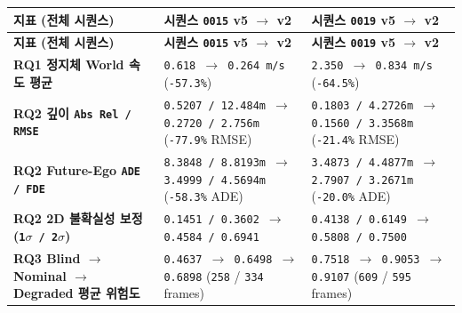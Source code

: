 \documentclass[10.5pt,a4paper]{article}
\begin{document}
\begin{footnotesize}
\setlength{\tabcolsep}{4pt}
\setlength{\LTleft}{0pt}\setlength{\LTright}{0pt}
\begin{longtable}{>{\raggedright\arraybackslash}p{} >{\raggedright\arraybackslash}p{} >{\raggedright\arraybackslash}p{}}
\toprule
\textbf{지표 (전체 시퀀스)} & \textbf{시퀀스 \texttt{0015} v5 $\rightarrow$ v2} & \textbf{시퀀스 \texttt{0019} v5 $\rightarrow$ v2} \\
\midrule
\endfirsthead
\toprule
\textbf{지표 (전체 시퀀스)} & \textbf{시퀀스 \texttt{0015} v5 $\rightarrow$ v2} & \textbf{시퀀스 \texttt{0019} v5 $\rightarrow$ v2} \\
\midrule
\endhead
\bottomrule
\endfoot
\textbf{RQ1 정지체 World 속도 평균} & \texttt{0.\allowbreak{}618 $\rightarrow$ 0.\allowbreak{}264 m/\allowbreak{}s} (\texttt{-\allowbreak{}57.\allowbreak{}3\%}) & \texttt{2.\allowbreak{}350 $\rightarrow$ 0.\allowbreak{}834 m/\allowbreak{}s} (\texttt{-\allowbreak{}64.\allowbreak{}5\%}) \\
\textbf{RQ2 깊이 \texttt{Abs Rel /\allowbreak{} RMSE}} & \texttt{0.\allowbreak{}5207 /\allowbreak{} 12.\allowbreak{}484m $\rightarrow$ 0.\allowbreak{}2720 /\allowbreak{} 2.\allowbreak{}756m} (\texttt{-\allowbreak{}77.\allowbreak{}9\%} RMSE) & \texttt{0.\allowbreak{}1803 /\allowbreak{} 4.\allowbreak{}2726m $\rightarrow$ 0.\allowbreak{}1560 /\allowbreak{} 3.\allowbreak{}3568m} (\texttt{-\allowbreak{}21.\allowbreak{}4\%} RMSE) \\
\textbf{RQ2 Future-Ego \texttt{ADE /\allowbreak{} FDE}} & \texttt{8.\allowbreak{}3848 /\allowbreak{} 8.\allowbreak{}8193m $\rightarrow$ 3.\allowbreak{}4999 /\allowbreak{} 4.\allowbreak{}5694m} (\texttt{-\allowbreak{}58.\allowbreak{}3\%} ADE) & \texttt{3.\allowbreak{}4873 /\allowbreak{} 4.\allowbreak{}4877m $\rightarrow$ 2.\allowbreak{}7907 /\allowbreak{} 3.\allowbreak{}2671m} (\texttt{-\allowbreak{}20.\allowbreak{}0\%} ADE) \\
\textbf{RQ2 2D 불확실성 보정 (\texttt{1$\sigma$ /\allowbreak{} 2$\sigma$})} & \texttt{0.\allowbreak{}1451 /\allowbreak{} 0.\allowbreak{}3602 $\rightarrow$ 0.\allowbreak{}4584 /\allowbreak{} 0.\allowbreak{}6941} & \texttt{0.\allowbreak{}4138 /\allowbreak{} 0.\allowbreak{}6149 $\rightarrow$ 0.\allowbreak{}5808 /\allowbreak{} 0.\allowbreak{}7500} \\
\textbf{RQ3 Blind $\rightarrow$ Nominal $\rightarrow$ Degraded 평균 위험도} & \texttt{0.\allowbreak{}4637 $\rightarrow$ 0.\allowbreak{}6498 $\rightarrow$ 0.\allowbreak{}6898} (\texttt{258} / \texttt{334} frames) & \texttt{0.\allowbreak{}7518 $\rightarrow$ 0.\allowbreak{}9053 $\rightarrow$ 0.\allowbreak{}9107} (\texttt{609} / \texttt{595} frames) \\
\end{longtable}
\end{footnotesize}
\end{document}
